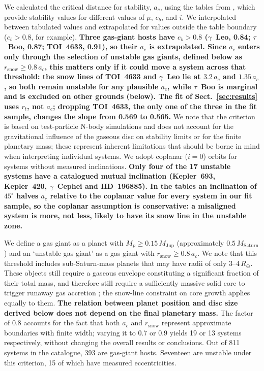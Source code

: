 \documentclass{aa}
\newcommand{\rev}[1]{{\color{red}\textbf{#1}}}
\begin{document}
We calculated the critical distance for stability, $a_c$, using the
tables from \citet{Quarles_2020}, which provide stability values for
different values of $\mu$, $e_b$, and $i$. We interpolated between
tabulated values and extrapolated for values outside the table boundary
($e_b > 0.8$, for example). \rev{Three gas-giant hosts have $e_b > 0.8$
($\gamma$~Leo, 0.84; $\tau$~Boo, 0.87; TOI~4633, 0.91), so their $a_c$ is
extrapolated. Since $a_c$ enters only through the selection of unstable
gas giants, defined below as $r_\mathrm{snow} \geq 0.8\,a_c$, this
matters only if it could move a system across that threshold: the snow
lines of TOI~4633 and $\gamma$~Leo lie at $3.2\,a_c$ and $1.35\,a_c$, so both
remain unstable for any plausible $a_c$, while $\tau$~Boo is marginal
and is excluded on other grounds (below). The fit of Sect.~\ref{sec:results}
uses $r_t$, not $a_c$; dropping TOI~4633, the only one of the three in
the fit sample, changes the slope from 0.569 to 0.565.} We note that the \citet{Quarles_2020}
criterion is based on test-particle N-body simulations and does not
account for the gravitational influence of the gaseous disc on stability
limits or for the finite planetary mass; these represent inherent
limitations that should be borne in mind when interpreting individual
systems. We adopt coplanar ($i = 0$) orbits for systems without measured
inclinations. \rev{Only four of the 17 unstable systems have a catalogued
mutual inclination (Kepler~693, Kepler~420, $\gamma$~Cephei and HD~196885).
In the \citet{Quarles_2020} tables an inclination of $45^\circ$ halves
$a_c$ relative to the coplanar value for every system in our fit sample,
so the coplanar assumption is conservative: a misaligned system is more,
not less, likely to have its snow line in the unstable zone.}

We define a gas giant as a planet with $M_p \geq 0.15\,M_\mathrm{Jup}$
(approximately $0.5\,M_\mathrm{Saturn}$) and an `unstable gas giant'
as a gas giant with $r_\mathrm{snow} \geq 0.8\,a_c$. We note that
this threshold includes sub-Saturn-mass planets that may have radii of
only 3--4\,$R_\oplus$. These objects still require a gaseous envelope
constituting a significant fraction of their total mass, and therefore
still require a sufficiently massive solid core to trigger runaway gas
accretion \citep{Pollack1996}; the snow-line constraint on core growth
applies equally to them. \rev{The relation between planet position and
disc size derived below does not depend on the final planetary mass.} The factor of 0.8 accounts for the
fact that both $a_c$ and $r_\mathrm{snow}$ represent approximate
boundaries with finite width; varying it to 0.7 or 0.9 yields 19 or
13 systems respectively, without changing the overall results or
conclusions. Out of 811 systems in the catalogue, 393 are gas-giant
hosts. Seventeen are unstable under this criterion, 15 of which have
measured eccentricities.
\end{document}
